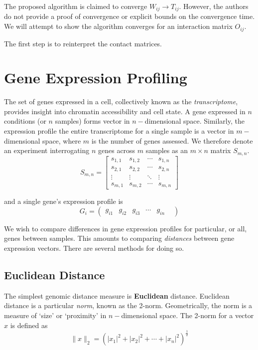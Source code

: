 The proposed algorithm is claimed to converge $W_{ij} \rightarrow T_{ij}$.  However, the authors do not provide a proof of convergence or
explicit bounds on the convergence time.  We will attempt to show the algorithm converges for an interaction matrix $O_{ij}$.

The first step is to reinterpret the contact matrices.



\section*{Gene Expression Profiling}

The set of genes expressed in a cell, collectively known as the \textit{transcriptome}, provides insight into chromatin accessibility
and cell state.  A gene expressed in $n$ conditions (or $n$ samples) forms vector in $n-$dimensional space.  Similarly, the expression
profile the entire transcriptome for a single sample is a vector in $m-$dimensional space, where $m$ is the number of genes assessed.
We therefore denote an experiment interrogating $n$ genes across $m$ samples as an $m \times n$ matrix $S_{m,n}$.
\[
  S_{m,n} = \left[
    \begin{array}{cccc}
      s_{1,1} & s_{1,2} & \cdots & s_{1,n} \\
      s_{2,1} & s_{2,2} & \cdots & s_{2,n} \\
      \vdots & \vdots & \ddots  & \vdots \\
      s_{m,1} & s_{m,2} & \cdots & s_{m,n}
    \end{array}
  \right]
\]

and a single gene's expression profile is
\[ G_{i} = \begin{pmatrix} g_{i1} & g_{i2} & g_{i3} & \cdots & g_{in} & \end{pmatrix} \]

We wish to compare differences in gene expression profiles for particular, or all, genes between samples.  This amounts to comparing
\textit{distances} between gene expression vectors.  There are several methods for doing so.

\subsection*{Euclidean Distance}

The simplest genomic distance measure is \textbf{Euclidean} distance.  Euclidean distance is a particular \textit{norm}, known as
the 2-norm.  Geometrically, the norm is a measure of `size' or `proximity' in $n-$dimensional space.  The 2-norm for a vector $x$ is
defined as
\[
  \|x\|_{2} = {(|x_1|^2 + |x_2|^2 + \cdots + |x_n|^2)}^{\frac{1}{2}}
\]

